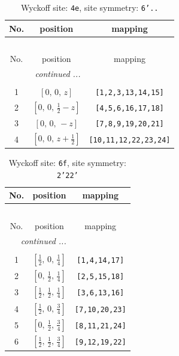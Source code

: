\documentclass[fleqn,8pt]{jsarticle}
\begin{document}
\renewcommand{\arraystretch}{1.2}
\begin{longtable}{ccc}
\caption{Wyckoff site: {\tt 4e}, site symmetry: {\tt 6'..}}
 \\
 \hline \hline
No. & position & mapping \\ \hline \endfirsthead

\multicolumn{2}{l}{\tablename\ \thetable{}} \\
 \hline \hline
No. & position & mapping \\ \hline \endhead

 \hline \hline
\multicolumn{2}{r}{\footnotesize\it continued ...} \\ \endfoot

 \hline \hline
\multicolumn{2}{r}{} \\ \endlastfoot

1 & $\left[ 0,\, 0,\, z \right]$ & {\tt [1,2,3,13,14,15]} \\ \hline
2 & $\left[ 0,\, 0,\, \frac{1}{2} - z \right]$ & {\tt [4,5,6,16,17,18]} \\ \hline
3 & $\left[ 0,\, 0,\, - z \right]$ & {\tt [7,8,9,19,20,21]} \\ \hline
4 & $\left[ 0,\, 0,\, z + \frac{1}{2} \right]$ & {\tt [10,11,12,22,23,24]} \\
\end{longtable}
\renewcommand{\arraystretch}{1.2}
\begin{longtable}{ccc}
\caption{Wyckoff site: {\tt 6f}, site symmetry: {\tt 2'22'}}
 \\
 \hline \hline
No. & position & mapping \\ \hline \endfirsthead

\multicolumn{2}{l}{\tablename\ \thetable{}} \\
 \hline \hline
No. & position & mapping \\ \hline \endhead

 \hline \hline
\multicolumn{2}{r}{\footnotesize\it continued ...} \\ \endfoot

 \hline \hline
\multicolumn{2}{r}{} \\ \endlastfoot

1 & $\left[ \frac{1}{2},\, 0,\, \frac{1}{4} \right]$ & {\tt [1,4,14,17]} \\ \hline
2 & $\left[ 0,\, \frac{1}{2},\, \frac{1}{4} \right]$ & {\tt [2,5,15,18]} \\ \hline
3 & $\left[ \frac{1}{2},\, \frac{1}{2},\, \frac{1}{4} \right]$ & {\tt [3,6,13,16]} \\ \hline
4 & $\left[ \frac{1}{2},\, 0,\, \frac{3}{4} \right]$ & {\tt [7,10,20,23]} \\ \hline
5 & $\left[ 0,\, \frac{1}{2},\, \frac{3}{4} \right]$ & {\tt [8,11,21,24]} \\ \hline
6 & $\left[ \frac{1}{2},\, \frac{1}{2},\, \frac{3}{4} \right]$ & {\tt [9,12,19,22]} \\
\end{longtable}
\end{document}
